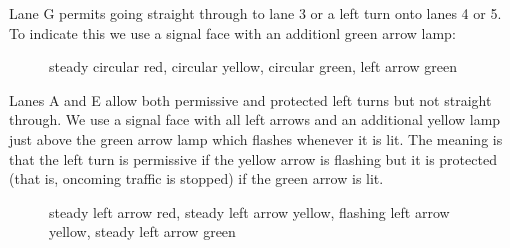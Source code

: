 \documentclass[letterpaper,twoside]{article}
\begin{document}
Lane G permits going straight through to lane 3 or a left turn onto lanes
4 or 5.  To indicate this we use a signal face with an additionl green
arrow lamp:

\begin{figure}[H]
           {\caption{steady circular red, circular yellow, circular green,
               left arrow green}\label{fig:signal_cccl}}
\end{figure}

Lanes A and E allow both permissive and protected left turns but not
straight through.  We use a signal face with all left arrows and an
additional yellow lamp just above the green arrow lamp which flashes
whenever it is lit.  The meaning is that the left turn is permissive
if the yellow arrow is flashing but it is  protected (that is, oncoming traffic
is stopped) if the green arrow is lit.

\begin{figure}[H]
           {\caption{steady left arrow red, steady left arrow yellow, flashing
               left arrow yellow, steady left arrow green}
             \label{signal_llll}}
\end{figure}
\end{document}
